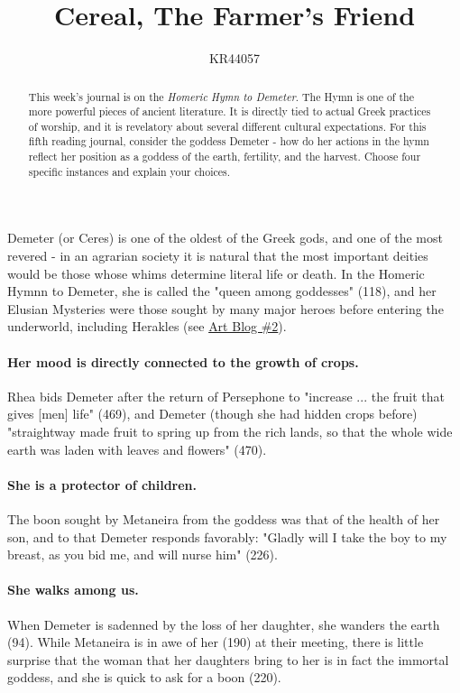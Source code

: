 \documentclass{article}
\title{Cereal, The Farmer's Friend}
\author{KR44057}
\begin{document}
\maketitle
\begin{abstract}
This week's journal is on the \textit{Homeric Hymn to Demeter}. The Hymn is one of the more powerful pieces of ancient literature. It is directly tied to actual Greek practices of worship, and it is revelatory about several different cultural expectations. For this fifth reading journal, consider the goddess Demeter - how do her actions in the hymn reflect her position as a goddess of the earth, fertility, and the harvest. Choose four specific instances and explain your choices.
\end{abstract}
Demeter (or Ceres) is one of the oldest of the Greek gods, and one of the most revered - in an agrarian society it is natural that the most important deities would be those whose whims determine literal life or death. In the Homeric Hymnn to Demeter, she is called the "queen among goddesses" (118), and her Elusian Mysteries were those sought by many major heroes before entering the underworld, including Herakles (see \href{https://lin.noblejury.com/umbc/myth/herakles-12.txt}{Art Blog \#2}).

\paragraph{Her mood is directly connected to the growth of crops.} Rhea bids Demeter after the return of Persephone to "increase ... the fruit that gives [men] life" (469), and Demeter (though she had hidden crops before) "straightway made fruit to spring up from the rich lands, so that the whole wide earth was laden with leaves and flowers" (470).
\paragraph{She is a protector of children.} The boon sought by Metaneira from the goddess was that of the health of her son, and to that Demeter responds favorably: "Gladly will I take the boy to my breast, as you bid me, and will nurse him" (226).
\paragraph{She walks among us.} When Demeter is sadenned by the loss of her daughter, she wanders the earth (94). While Metaneira is in awe of her (190) at their meeting, there is little surprise that the woman that her daughters bring to her is in fact the immortal goddess, and she is quick to ask for a boon (220).
\end{document}
